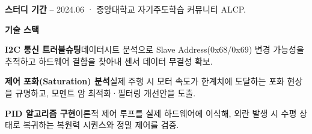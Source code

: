

\begin{cvitems}
  \item {\textbf{스터디 기간} -- 2024.06 · 중앙대학교 자기주도학습 커뮤니티 ALCP.}
  \item {\textbf{기술 스택}\enskip {}    }
\end{cvitems}

\begin{cvitems}
  \item {\textbf{I2C 통신 트러블슈팅}\enskip 데이터시트 분석으로 Slave Address(0x68/0x69) 변경 가능성을 추적하고 하드웨어 결함을 찾아내 센서 데이터 무결성 확보.}
  \item {\textbf{제어 포화(Saturation) 분석}\enskip 실제 주행 시 모터 속도가 한계치에 도달하는 포화 현상을 규명하고, 모멘트 암 최적화·필터링 개선안을 도출.}
  \item {\textbf{PID 알고리즘 구현}\enskip 이론적 제어 루프를 실제 하드웨어에 이식해, 외란 발생 시 수평 상태로 복귀하는 복원력 시퀀스와 정밀 제어를 검증.}
\end{cvitems}

